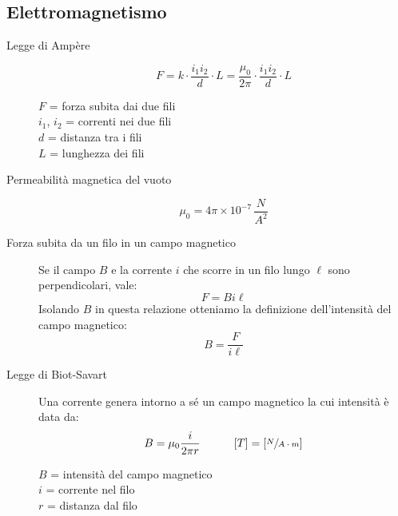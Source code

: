 \documentclass[a4paper,11pt,italian]{article}
\begin{document}
\subsection{Elettromagnetismo}

\begin{description}
  \item[Legge di Ampère]
  \[ F = k\cdot  \frac{i_1 i_2}{d}\cdot L = \frac{\mu_0}{2\pi} \cdot \frac{i_1 i_2}{d}\cdot L \]
  \begin{multicols}{2}
  $ F $ = forza subita dai due fili\\
  $ i_1 $, $ i_2 $ = correnti nei due fili\\
  $ d $ = distanza tra i fili\\
  $ L $ = lunghezza dei fili
  \end{multicols}
  
  \item[Permeabilità magnetica del vuoto]
  \[ \mu_0 = 4\pi \times 10^{-7} \, \frac{N}{A^2} \]
  
  \item[Forza subita da un filo in un campo magnetico] 
  Se il campo $ B $ e la corrente $ i $ che scorre in un filo lungo $ \ell $ sono perpendicolari, vale:\[ F = Bi\ell \]
  Isolando $ B $ in questa relazione otteniamo la definizione dell'intensità del campo magnetico:
  \[ B = \frac{F}{i\ell} \]
%   
  
  \item[Legge di Biot-Savart] 
  Una corrente genera intorno a sé un campo magnetico la cui intensità è data da:
  \[ B = \mu_0\dfrac{i}{2\pi r} \hspace*{3em} [T] = \left[ \sfrac{N}{A\cdot m} \right] \]
  \begin{multicols}{2}
  $ B $ = intensità del campo magnetico\\
  $ i $ = corrente nel filo\\
  $ r $ = distanza dal filo
  \end{multicols}  

%   
  

\end{description}
\end{document}
